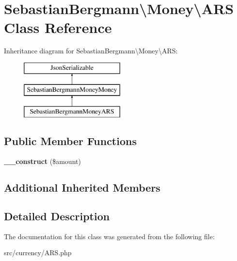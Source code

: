 \hypertarget{classSebastianBergmann_1_1Money_1_1ARS}{}\section{Sebastian\+Bergmann\textbackslash{}Money\textbackslash{}A\+R\+S Class Reference}
\label{classSebastianBergmann_1_1Money_1_1ARS}
Inheritance diagram for Sebastian\+Bergmann\textbackslash{}Money\textbackslash{}A\+R\+S\+:\begin{figure}[H]
\begin{center}
\leavevmode
\includegraphics[height=3.000000cm]{classSebastianBergmann_1_1Money_1_1ARS}
\end{center}
\end{figure}
\subsection*{Public Member Functions}
\begin{DoxyCompactItemize}
\item 
\hypertarget{classSebastianBergmann_1_1Money_1_1ARS_abb68ef6b95c803584801dcbf12327fd9}{}{\bfseries \+\_\+\+\_\+construct} (\$amount)\label{classSebastianBergmann_1_1Money_1_1ARS_abb68ef6b95c803584801dcbf12327fd9}

\end{DoxyCompactItemize}
\subsection*{Additional Inherited Members}


\subsection{Detailed Description}


The documentation for this class was generated from the following file\+:\begin{DoxyCompactItemize}
\item 
src/currency/A\+R\+S.\+php\end{DoxyCompactItemize}
